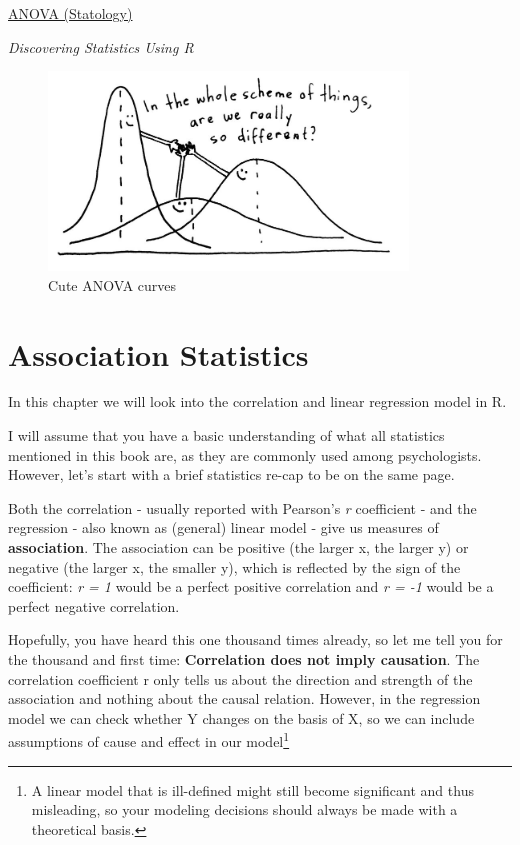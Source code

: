 \documentclass[
]{book}
\begin{document}
\href{https://www.statology.org/interpret-anova-results-in-r/}{ANOVA (Statology)}

\emph{Discovering Statistics Using R} \citep{field2012}

\begin{figure}
\centering
\includegraphics[width=\textwidth,height=2.08333in]{./img/sweet-anova.png}
\caption{Cute ANOVA curves}
\end{figure}

\chapter{Association Statistics}\label{association-statistics}

In this chapter we will look into the correlation and linear regression model in R.

I will assume that you have a basic understanding of what all statistics mentioned in this book are, as they are commonly used among psychologists. However, let's start with a brief statistics re-cap to be on the same page.

Both the correlation - usually reported with Pearson's \emph{r} coefficient - and the regression - also known as (general) linear model - give us measures of \textbf{association}.
The association can be positive (the larger x, the larger y) or negative (the larger x, the smaller y), which is reflected by the sign of the coefficient: \emph{r = 1} would be a perfect positive correlation and \emph{r = -1} would be a perfect negative correlation.

Hopefully, you have heard this one thousand times already, so let me tell you for the thousand and first time: \textbf{Correlation does not imply causation}.
The correlation coefficient r only tells us about the direction and strength of the association and nothing about the causal relation.
However, in the regression model we can check whether Y changes on the basis of X, so we can include assumptions of cause and effect in our model\footnote{A linear model that is ill-defined might still become significant and thus misleading, so your modeling decisions should always be made with a theoretical basis.}
\end{document}
